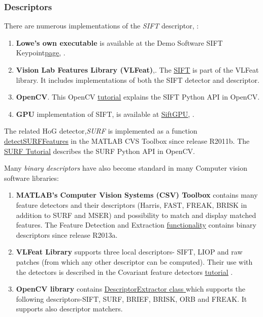 {\subsubsection{Descriptors}\label{soft:salregdescr:subsec}

There are numerous implementations of the {\em SIFT} descriptor, \cite{Lowe:2004}:
\begin{enumerate}
\item{{\bf Lowe's own executable} is available at the Demo Software SIFT Keypoint\href{http://www.cs.ubc.ca/~lowe/keypoints/}{\underline{page}}, \cite{lowe_sift_soft}.}
\item{{\bf Vision Lab Features Library (VLFeat)},\cite{vlfeat_soft}. The \href{http://www.vlfeat.org/api/sift.html}{\underline{SIFT}} is part of the VLFeat library. It includes implementations of both the SIFT detector and descriptor.}
\item{{\bf OpenCV}. This OpenCV \href{http://docs.opencv.org/master/da/df5/tutorial_py_sift_intro.html}{\underline{tutorial}} explains the SIFT Python API in OpenCV.}
\item{{\bf GPU} implementation of SIFT, \cite{Sinha06gpu-basedvideo} is available at \href{http://cs.unc.edu/~ccwu/siftgpu/}{\underline{SiftGPU}}, \cite{sift_gpu_soft}.} 
\end{enumerate}

The related HoG detector,{\em SURF}  is implemented as a function \href{http://nl.mathworks.com/help/vision/ref/detectsurffeatures.html}{\underline{\textsf{detectSURFFeatures}}} in the MATLAB CVS Toolbox since release R2011b. The \href{http://docs.opencv.org/master/df/dd2/tutorial_py_surf_intro.html}{\underline{SURF Tutorial}} describes the SURF Python API in OpenCV.

Many {\em binary descriptors} have also become standard in many Computer vision software libraries:
\begin{enumerate}
\item{{\bf MATLAB's Computer Vision Systems (CSV) Toolbox} contains many feature detectors and their descriptors (Harris, FAST, FREAK, BRISK in addition to SURF and MSER) and possibility to match and display matched features. The Feature Detection and Extraction \href{http://nl.mathworks.com/help/vision/feature-detection-extraction-and-matching.html}{\underline{functionality}} contains binary descriptors since release R2013a.}
\item{ {\bf VLFeat Library} supports three local descriptors- SIFT, LIOP and raw patches (from which any other descriptor can be computed). Their use with the  detectors is described in the Covariant feature detectors \href{http://www.vlfeat.org/overview/covdet.html}{\underline{tutorial}} }. 
\item{ {\bf OpenCV library} contains \href{http://docs.opencv.org/modules/features2d/doc/common_interfaces_of_descriptor_extractors.html?highlight=descriptorextractor#descriptorextractor}{\underline{\textsf{DescriptorExtractor class}} } which supports the following descriptors-SIFT, SURF, BRIEF, BRISK, ORB and FREAK. It supports also descriptor matchers.}
\end{enumerate}

}
